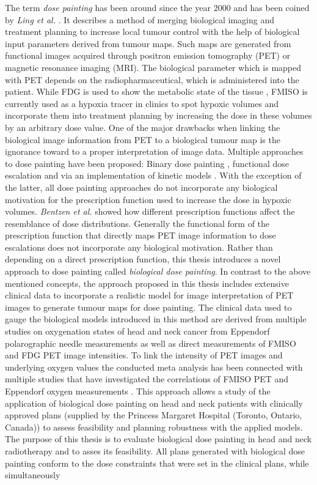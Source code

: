 The term \textit{dose painting} has been around since the year 2000 and has been coined by \textit{Ling et al.} \cite{pmid10837935}. It describes a method of merging biological imaging and treatment planning to increase local tumour control with the help of biological input parameters derived from tumour maps. Such maps are generated from functional images acquired through positron emission tomography (PET) or magnetic resonance imaging (MRI). The biological parameter which is mapped with PET depends on the radiopharmaceutical, which is administered into the patient. While FDG is used to show the metabolic state of the tissue \cite{pmid16841141}, FMISO is currently used as a hypoxia tracer in clinics to spot hypoxic volumes and incorporate them into treatment planning by increasing the dose in these volumes by an arbitrary dose value. One of the major drawbacks when linking the biological image information from PET to a biological tumour map is the ignorance toward to a proper interpretation of image data. Multiple approaches to dose painting have been proposed: Binary dose painting \cite{pmid20855118, pmid11240261, pmid17869020}, functional dose escalation \cite{pmid12587912, pmid21356478, pmid20643512, pmid18635895} and via an implementation of kinetic models \cite{pmid17448882}. With the exception of the latter, all dose painting approaches do not incorporate any biological motivation for the prescription function used to increase the dose in hypoxic volumes. \textit{Bentzen et al.} \cite{pmid19218733} showed how different prescription functions affect the resemblance of dose distributions. Generally the functional form of the prescription function that directly maps PET image information to dose escalations does not incorporate any biological motivation. Rather than depending on a direct prescription function, this thesis introduces a novel approach to dose painting called \textit{biological dose painting}. In contrast to the above mentioned concepts, the approach proposed in this thesis includes extensive clinical data to incorporate a realistic model for image interpretation of PET images to generate tumour maps for dose painting. The clinical data used to gauge the biological models introduced in this method are derived from multiple studies on oxygenation states of head and neck cancer from Eppendorf polarographic needle measurements as well as direct measurements of FMISO and FDG PET image intensities. To link the intensity of PET images and underlying oxygen values the conducted meta analysis has been connected with multiple studies that have investigated the correlations of FMISO PET and Eppendorf oxygen measurements \cite{pmid17598907, pmid12865184, pmid20831480}. This approach allows a study of the application of biological dose painting on head and neck patients with clinically approved plans (supplied by the Princess Margaret Hospital (Toronto, Ontario, Canada)) to assess feasibility and planning robustness with the applied models.\\The purpose of this thesis is to evaluate biological dose painting in head and neck radiotherapy and to asses its feasibility. All plans generated with biological dose painting conform to the dose constraints that were set in the clinical plans, while simultaneously 